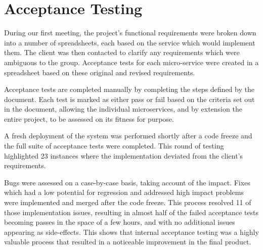 \section{Acceptance Testing}
\par
During our first meeting, the project's functional requirements were broken down into a number of spreadsheets, each based on the service which would implement them. The client was then contacted to clarify any requirements which were ambiguous to the group. Acceptance tests for each micro-service were created in a spreadsheet based on these original and revised requirements.

\par
Acceptance tests are completed manually by completing the steps defined by the document. Each test is marked as either pass or fail based on the criteria set out in the document, allowing the individual microservices, and by extension the entire project, to be assessed on its fitness for purpose.

\par
A fresh deployment of the system was performed shortly after a code freeze and the full suite of acceptance tests were completed. This round of testing highlighted 23 instances where the implementation deviated from the client's requirements.

\par
Bugs were assessed on a case-by-case basis, taking account of the impact. Fixes which had a low potential for regression and addressed high impact problems were implemented and merged after the code freeze. This process resolved 11 of those implementation issues, resulting in almost half of the failed acceptance tests becoming passes in the space of a few hours, and with no additional issues appearing as side-effects. This shows that internal acceptance testing was a highly valuable process that resulted in a noticeable improvement in the final product.
